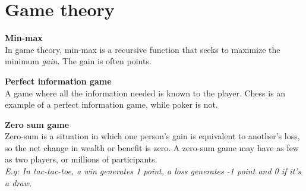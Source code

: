 \section{Game theory}

\textbf{Min-max} \\
In game theory, min-max is a recursive function that seeks to maximize the minimum \textit{gain}. The gain is often points. 

\textbf{Perfect information game} \\
A game where all the information needed is known to the player. Chess is an example of a perfect information game, while poker is not. 

\textbf{Zero sum game} \\
Zero-sum is a situation in which one person's gain is equivalent to another's loss, so the net change in wealth or benefit is zero. A zero-sum game may have as few as two players, or millions of participants. \\
\textit{E.g: In tac-tac-toe, a win generates 1 point, a loss generates -1 point and 0 if it's a draw.}

